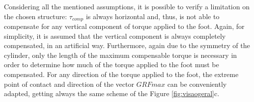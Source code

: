\documentclass[tog]{acmsiggraph}
\begin{document}
Considering all the mentioned assumptions, it is possible to verify a limitation on the chosen structure: $\tau_{comp}$ is always horizontal and, thus,
is not able to compensate for any vertical component of torque applied to the foot.
Again, for simplicity, it is assumed that the vertical component is always completely compensated, in an artificial way.
%
Furthermore, again due to the symmetry of the cylinder, only the length of the maximum compensable torque is necessary in order to determine how much of the torque applied to the foot must be compensated.
For any direction of the torque applied to the foot, the extreme point of contact and direction of the vector $GRFmax$ can be conveniently adapted, getting always the same scheme of the Figure \ref{fig:visaogeral}c.
\end{document}
